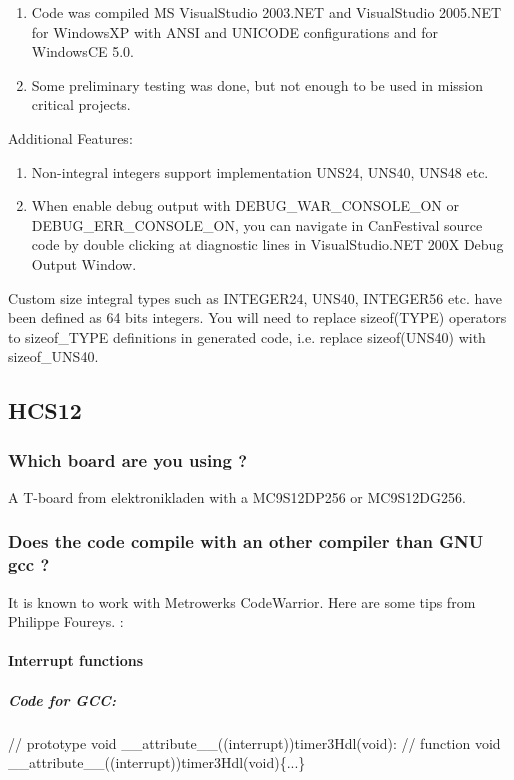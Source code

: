 \documentclass[a4paper,12pt]{book}
\newcommand\liststyleLxi{%
\renewcommand\labelitemi{{--}}
\renewcommand\labelitemii{{--}}
\renewcommand\labelitemiii{{--}}
\renewcommand\labelitemiv{{--}}
}
\newcommand\liststyleLxii{%
\renewcommand\labelitemi{{--}}
\renewcommand\labelitemii{{--}}
\renewcommand\labelitemiii{{--}}
\renewcommand\labelitemiv{{--}}
}
\begin{document}
\liststyleLxi
\begin{enumerate}
\item Code was compiled MS VisualStudio 2003.NET and VisualStudio
2005.NET for WindowsXP \space with ANSI and UNICODE configurations and for
WindowsCE 5.0. 
\item Some preliminary testing was done, but not enough to be used in
mission critical projects.
\end{enumerate}
Additional Features:

\liststyleLxii
\begin{enumerate}
\item Non{}-integral integers support implementation UNS24, UNS40, UNS48
etc.
\item When enable debug output with DEBUG\_WAR\_CONSOLE\_ON or
DEBUG\_ERR\_CONSOLE\_ON, you can navigate in CanFestival source code by
double clicking at diagnostic lines in VisualStudio.NET 200X Debug
Output Window.
\end{enumerate}
Custom size integral types such as INTEGER24, UNS40, INTEGER56 etc. have
been defined as 64 bits integers. You will need to replace sizeof(TYPE)
operators to sizeof\_TYPE definitions in generated code, i.e. replace
sizeof(UNS40) with sizeof\_UNS40.


\bigskip

\subsection{HCS12}
\subsubsection{Which board are you using ?}
A T{}-board from elektronikladen with a MC9S12DP256 or MC9S12DG256.

\subsubsection{Does the code compile with an other compiler than GNU gcc
?}
It is known to work with Metrowerks CodeWarrior. Here are some tips from
Philippe Foureys. :

\paragraph{Interrupt functions}
\subparagraph{Code for GCC:}
{\ttfamily
 // prototype\newline
 void \_\_attribute\_\_((interrupt))timer3Hdl(void):\newline
 // function\newline
 void \_\_attribute\_\_((interrupt))timer3Hdl(void)\{...\}}
\end{document}
